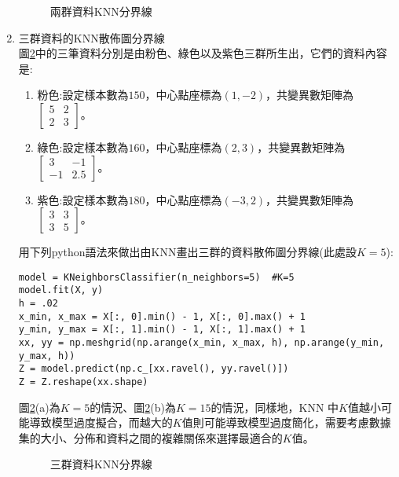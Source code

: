 \documentclass[12pt, a4paper]{article}
\begin{document}
\begin{enumerate}
\begin{figure}[H]
\centering
{}
\caption{兩群資料KNN分界線}
\label{fig:parallel_k}
\end{figure}

\item 三群資料的KNN散佈圖分界線\\
圖\;\ref{fig:parallel_k1}\;中的三筆資料分別是由粉色、綠色以及紫色三群所生出，它們的資料內容是\;:
\begin{enumerate}
\item 粉色\;:\;設定樣本數為\;$150$\;，中心點座標為\;$(1,-2)$\;，共變異數矩陣為\;$\begin{bmatrix}5 & 2 \\2 & 3 \end{bmatrix}$\;。
\item 綠色\;:\;設定樣本數為\;$160$\;，中心點座標為\;$(2,3)$\;，共變異數矩陣為\;$\begin{bmatrix}3 & -1 \\-1 & 2.5 \end{bmatrix}$\;。
\item 紫色\;:\;設定樣本數為\;$180$\;，中心點座標為\;$(-3,2)$\;，共變異數矩陣為\;$\begin{bmatrix}3 & 3 \\3 & 5 \end{bmatrix}$\;。
\end{enumerate}

用下列python語法來做出由KNN畫出三群的資料散佈圖分界線(此處設\;$K=5$\;)\;:
\begin{lstlisting}
model = KNeighborsClassifier(n_neighbors=5)  #K=5
model.fit(X, y)
h = .02 
x_min, x_max = X[:, 0].min() - 1, X[:, 0].max() + 1
y_min, y_max = X[:, 1].min() - 1, X[:, 1].max() + 1
xx, yy = np.meshgrid(np.arange(x_min, x_max, h), np.arange(y_min, y_max, h))
Z = model.predict(np.c_[xx.ravel(), yy.ravel()])
Z = Z.reshape(xx.shape)
\end{lstlisting}

圖\;\ref{fig:parallel_k1}\;(a)\;為\;$K=5$\;的情況、圖\;\ref{fig:parallel_k1}\;(b)\;為\;$K=15$\;的情況，同樣地，KNN 中\;$K$\;值越小可能導致模型過度擬合，而越大的\;$K$\;值則可能導致模型過度簡化，需要考慮數據集的大小、分佈和資料之間的複雜關係來選擇最適合的\;$K$\;值。

\begin{figure}[H]
\centering
{}
\caption{三群資料KNN分界線}
\label{fig:parallel_k1}
\end{figure}
\end{enumerate}
\end{document}
